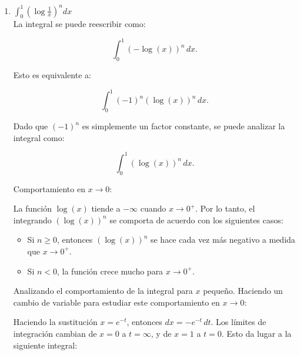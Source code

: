 \documentclass{article}
\begin{document}
\begin{enumerate}
\begin{enumerate}
Comportamiento de \( \log(\sin(x)) \) en \( x \to \pi \):

Cerca de \( x = \pi \), se puede usar \( \sin(x) \sim \pi - x \). Así:
\[
\log(\sin(x)) \sim \log(\pi - x).
\]
El integrando cerca de \( x = \pi \) se comporta como:
\[
x \log(\sin(x)) \sim x \log(\pi - x).
\]
Sea 
\[
I = \int_{\pi-\epsilon}^\pi x \log(\pi - x) \, dx.
\]
Haciendo la sustitución \( u = \pi - x \), de modo que \( du = -dx \) y los límites cambian de \( x \in (\pi - \epsilon, \pi) \) a \( u \in (0, \epsilon) \). Entonces:
\[
I = \int_0^\epsilon (\pi - u) \log(u) (-du) = \int_0^\epsilon (\pi - u)(-\log(u)) \, du.
\]
Expandiendo
\[
I = \pi \int_0^\epsilon -\log(u) \, du - \int_0^\epsilon u (-\log(u)) \, du.
\]
Ambos términos contienen integrales de la forma \( \int_0^\epsilon u^n \log(u) \, du \), las cuales convergen porque la divergencia de \( \log(u) \) en \( u \to 0 \) es contrarrestada por \( u^n \) para \( n > 0 \).

Por lo tanto, la integral converge.

		\item $ \int_{0}^{1} \left(\log \frac{1}{x}\right)^n dx  $
\[\]       
La integral se puede reescribir como:

\[
\int_0^1 (-\log(x))^n \, dx.
\]

Esto es equivalente a:

\[
\int_0^1 (-1)^n (\log(x))^n \, dx.
\]

Dado que $(-1)^n$ es simplemente un factor constante, se puede analizar la integral como:

\[
\int_0^1 (\log(x))^n \, dx.
\]

Comportamiento en $x \to 0$:

La función $\log(x)$ tiende a $-\infty$ cuando $x \to 0^+$. Por lo tanto, el integrando $(\log(x))^n$ se comporta de acuerdo con los siguientes casos:

\begin{itemize}
    \item Si $n \geq 0$, entonces $(\log(x))^n$ se hace cada vez más negativo a medida que $x \to 0^+$.
    \item Si $n < 0$, la función crece mucho para $x \to 0^+$.
\end{itemize}

Analizando el comportamiento de la integral para $x$ pequeño. Haciendo un cambio de variable para estudiar este comportamiento en $x \to 0$:

Haciendo la sustitución $x = e^{-t}$, entonces $dx = -e^{-t} \, dt$. Los límites de integración cambian de $x = 0$ a $t = \infty$, y de $x = 1$ a $t = 0$. Esto da lugar a la siguiente integral:


\end{enumerate}
\end{enumerate}
\end{document}
